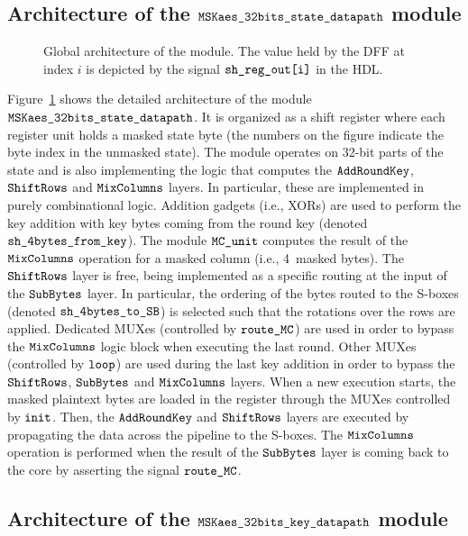 \documentclass{scrartcl}
\begin{document}
\subsection{Architecture of the $\texttt{MSKaes\_32bits\_state\_datapath}$ module}
\label{sec:architecture}

\begin{figure}
    \centering
    \resizebox{\textwidth}{!}{
        \begin{tikzpicture}
            
        \end{tikzpicture}
    }
    \caption{Global architecture of the \modAESdpState module. The value held by the DFF at index $i$ is depicted by the signal $\texttt{sh\_reg\_out[i]}$ in the HDL.}
    \label{fig:aes_dpState}
\end{figure}

Figure~\ref{fig:aes_dpState} shows the detailed architecture of the
module $\texttt{MSKaes\_32bits\_state\_datapath}$. It is organized as a shift register where each
register unit holds a masked state byte (the numbers on the figure
indicate the byte index in the unmasked state).
The module operates on 32-bit parts of the state and is also implementing the
logic that computes the $\texttt{AddRoundKey}$, $\texttt{ShiftRows}$ and $\texttt{MixColumns}$ layers.
In particular, these are implemented in purely
combinational logic.
Addition gadgets (i.e., XORs) are used to perform the key addition with key
bytes coming from the round
key (denoted $\texttt{sh\_4bytes\_from\_key}$).
The module $\texttt{MC\_unit}$ computes the
result of the $\texttt{MixColumns}$ operation for a masked column (i.e., 4~masked bytes). The
$\texttt{ShiftRows}$ layer is free, being implemented as a specific
routing at the input of the $\texttt{SubBytes}$ layer.
In particular, the ordering of the bytes routed to the
S-boxes (denoted $\texttt{sh\_4bytes\_to\_SB}$) is selected such that the rotations over
the rows are applied. Dedicated MUXes (controlled by $\texttt{route\_MC}$) are
used in order to bypass the $\texttt{MixColumns}$ logic block when executing the last round.
Other MUXes (controlled by $\texttt{loop}$) are used during the
last key addition in order to bypass the $\texttt{ShiftRows}$, $\texttt{SubBytes}$ and $\texttt{MixColumns}$ layers.
When a new execution starts, the masked plaintext bytes are loaded in the register through the 
MUXes controlled by $\texttt{init}$.
Then, the $\texttt{AddRoundKey}$ and $\texttt{ShiftRows}$ layers are executed by propagating the data 
across the pipeline to the S-boxes.
The $\texttt{MixColumns}$ operation is performed when the result of the $\texttt{SubBytes}$ layer is coming back to the 
core by asserting the signal $\texttt{route\_MC}$. 

\subsection{Architecture of the $\texttt{MSKaes\_32bits\_key\_datapath}$ module}
\end{document}
